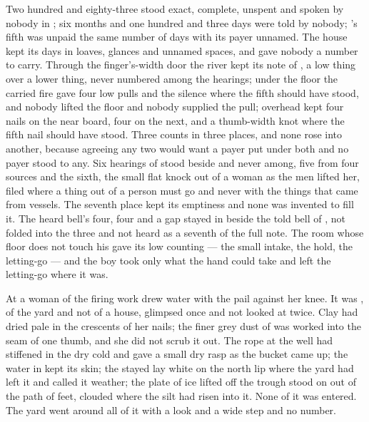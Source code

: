 Two hundred and eighty-three stood exact, complete, unspent and spoken by nobody in ; six months and one hundred and three days were told by nobody; 's fifth was unpaid the same number of days with its payer unnamed. The house kept its days in loaves, glances and unnamed spaces, and gave nobody a number to carry. Through the finger's-width door the river kept its note of , a low thing over a lower thing, never numbered among the hearings; under the floor the carried fire gave four low pulls and the silence where the fifth should have stood, and nobody lifted the floor and nobody supplied the pull; overhead  kept four nails on the near board, four on the next, and a thumb-width knot where the fifth nail should have stood. Three counts in three places, and none rose into another, because agreeing any two would want a payer put under both and no payer stood to any. Six hearings of  stood beside and never among, five from four sources and the sixth, the small flat knock out of a woman as the men lifted her, filed where a thing out of a person must go and never with the things that came from vessels. The seventh place kept its emptiness and none was invented to fill it. The heard bell's four, four and a gap stayed in  beside the told bell of , not folded into the three and not heard as a seventh of the full note. The room whose floor does not touch his gave its low counting --- the small intake, the hold, the letting-go --- and the boy took only what the hand could take and left the letting-go where it was.

At  a woman of the firing work drew water with the pail against her knee. It was , of the yard and not of a house, glimpsed once and not looked at twice. Clay had dried pale in the crescents of her nails; the finer grey dust of  was worked into the seam of one thumb, and she did not scrub it out. The rope at the well had stiffened in the dry cold and gave a small dry rasp as the bucket came up; the water in  kept its skin; the stayed  lay white on the north lip where the yard had left it and called it weather; the plate of ice lifted off the trough stood on  out of the path of feet, clouded where the silt had risen into it. None of it was entered. The yard went around all of it with a look and a wide step and no number.

